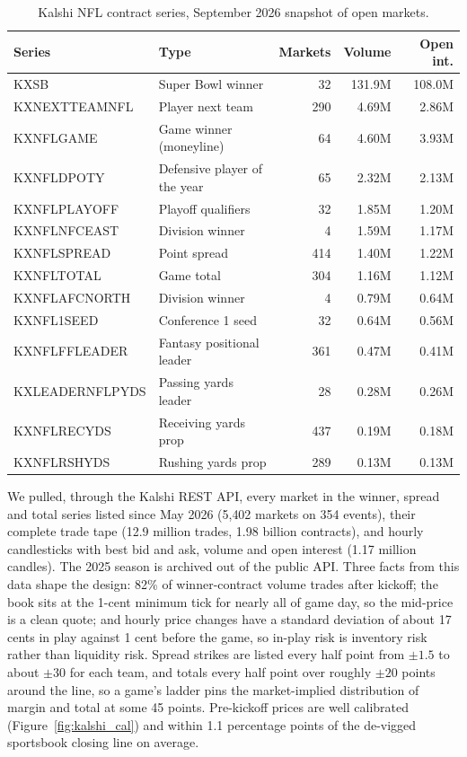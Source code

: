 \documentclass[11pt]{article}
\begin{document}
\begin{table}[H]
\centering
\footnotesize
\begin{tabular}{llrrr}
\toprule
\textbf{Series} & \textbf{Type} & \textbf{Markets} & \textbf{Volume} & \textbf{Open int.} \\
\midrule
KXSB & Super Bowl winner & 32 & 131.9M & 108.0M \\
KXNEXTTEAMNFL & Player next team & 290 & 4.69M & 2.86M \\
KXNFLGAME & Game winner (moneyline) & 64 & 4.60M & 3.93M \\
KXNFLDPOTY & Defensive player of the year & 65 & 2.32M & 2.13M \\
KXNFLPLAYOFF & Playoff qualifiers & 32 & 1.85M & 1.20M \\
KXNFLNFCEAST & Division winner & 4 & 1.59M & 1.17M \\
KXNFLSPREAD & Point spread & 414 & 1.40M & 1.22M \\
KXNFLTOTAL & Game total & 304 & 1.16M & 1.12M \\
KXNFLAFCNORTH & Division winner & 4 & 0.79M & 0.64M \\
KXNFL1SEED & Conference 1 seed & 32 & 0.64M & 0.56M \\
KXNFLFFLEADER & Fantasy positional leader & 361 & 0.47M & 0.41M \\
KXLEADERNFLPYDS & Passing yards leader & 28 & 0.28M & 0.26M \\
KXNFLRECYDS & Receiving yards prop & 437 & 0.19M & 0.18M \\
KXNFLRSHYDS & Rushing yards prop & 289 & 0.13M & 0.13M \\
\bottomrule
\end{tabular}
\caption{Kalshi NFL contract series, September 2026 snapshot of open markets.}
\label{tab:kalshi_series}
\end{table}

We pulled, through the Kalshi REST API, every market in the winner, spread and total series listed since May 2026 (5,402 markets on 354 events), their complete trade tape (12.9 million trades, 1.98 billion contracts), and hourly candlesticks with best bid and ask, volume and open interest (1.17 million candles). The 2025 season is archived out of the public API. Three facts from this data shape the design: 82\% of winner-contract volume trades after kickoff; the book sits at the 1-cent minimum tick for nearly all of game day, so the mid-price is a clean quote; and hourly price changes have a standard deviation of about 17 cents in play against 1 cent before the game, so in-play risk is inventory risk rather than liquidity risk. Spread strikes are listed every half point from $\pm1.5$ to about $\pm30$ for each team, and totals every half point over roughly $\pm20$ points around the line, so a game's ladder pins the market-implied distribution of margin and total at some 45 points. Pre-kickoff prices are well calibrated (Figure~\ref{fig:kalshi_cal}) and within 1.1 percentage points of the de-vigged sportsbook closing line on average.
\end{document}
